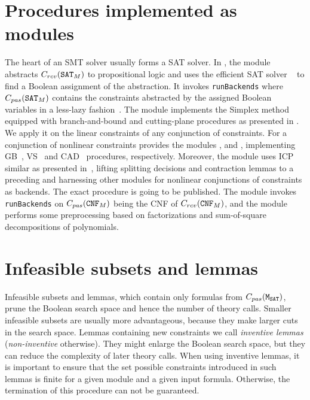 \section{Procedures implemented as modules}
\label{sec:implemented_modules}
The heart of an SMT solver usually forms a SAT solver. In \smtrat, the module \satModule abstracts $C_{rcv}(\texttt{SAT$_M$})$ to propositional logic and uses the efficient SAT solver \minisat~\cite{minisat} to find a Boolean assignment of the abstraction. It invokes \texttt{runBackends} where $C_{pas}(\texttt{SAT$_M$})$ contains the constraints abstracted by the assigned Boolean variables in a less-lazy fashion~\cite{sebastiani2007lazy}. The module \simplexModule implements the Simplex method equipped with branch-and-bound and cutting-plane procedures as presented in \cite{DM06}. We apply it on the linear constraints of any conjunction of \supportedLogics constraints. For a conjunction of nonlinear constraints \smtrat provides the modules \gbModule, \vsModule and \cadModule, implementing GB~\cite{JLCA_CAI13}, VS~\cite{Article_Corzilius_FCT2011} and CAD~\cite{Article_Loup_TubeCAD} procedures, respectively. Moreover, the module \icpModule uses ICP similar as presented in~\cite{GGIGSC10}, lifting splitting decisions and contraction lemmas to a preceding \satModule and harnessing other modules for nonlinear conjunctions of constraints as backends. The exact procedure is going to be published. The module \cnfModule invokes \texttt{runBackends} on $C_{pas}(\texttt{CNF$_M$})$ being the CNF of $C_{rcv}(\texttt{CNF$_M$})$, and the module \ppModule performs some preprocessing based on factorizations and sum-of-square decompositions of polynomials.

\section{Infeasible subsets and lemmas}
\label{sec::infsubset_lemmas}
Infeasible subsets and lemmas, which contain only formulas from 
$C_{pas}(\texttt{M$_\text{SAT}$})$, prune the Boolean search space and hence the number of theory calls. 
Smaller infeasible subsets are usually more advantageous, because they make larger cuts 
in the search space. Lemmas containing new constraints we call
\emph{inventive lemmas} (\emph{non-inventive} otherwise). They might enlarge the 
Boolean search space, but they can reduce the complexity of later theory calls.
When using inventive lemmas, it is important to ensure that the set possible
constraints introduced in such lemmas is finite for a given module and a given 
input formula. Otherwise, the termination of this procedure can not be guaranteed.

